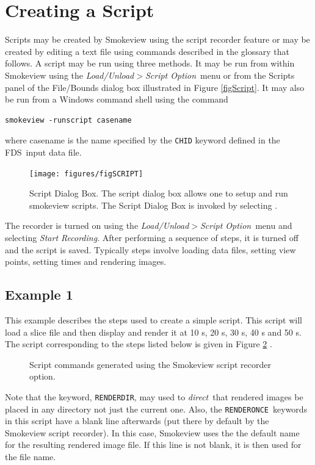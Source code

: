\documentclass[11pt,twoside]{book}
\newcommand{\fdsinput}[1]{
{
\scriptsize

}
}
\newcommand{\figoptions}{hbp}
\newcommand{\fds}{{FDS}}
\newcommand{\frameit}[1]{\fbox{\tt #1}}
\begin{document}
\section{Creating a Script}
Scripts may be created by Smokeview using the script recorder feature
or may be created by editing a text file using commands described in the glossary that follows.
A script may be run using three methods.  It may be run from within Smokeview using
the {\em Load/Unload$>$Script Option}\ menu or
from the Scripts panel of the File/Bounds dialog box illustrated in Figure \ref{figScript}.
It may also be run from a Windows command shell using the command

\begin{verbatim}
smokeview -runscript casename
\end{verbatim}

\noindent where casename is the name specified by
the {\tt CHID} keyword defined in the \fds\ input data file.

\begin{figure}[\figoptions]
\centerline{
\texttt{[image: figures/figSCRIPT]}
}
\caption[Script Dialog Box.]{Script Dialog Box. The script dialog box allows one
to setup and run smokeview scripts.  The
Script Dialog Box is invoked by selecting
\frameit{Dialogs$>$File/Bounds}. }
\label{figSCRIPT}
\end{figure}

The recorder is turned on using the
{\em Load/Unload$>$Script Option}\ menu and selecting {\em Start Recording}.
After performing a sequence of steps, it is turned off and the script is saved. Typically steps involve loading data files,
setting view points, setting times and rendering images.

\subsection{Example 1}

This example describes the steps used to create a simple script.  This script
will load a slice file and then display and render it at 10 s, 20 s, 30 s, 40 s and 50 s.
The script corresponding to the steps listed below is given
in Figure \ref{figsimplescripttext} .
\begin{figure}[\figoptions]
\fdsinput{script_slice_test.ssf}
\caption{Script commands generated using the Smokeview script recorder option.}
\label{figsimplescripttext}%
\end{figure}

Note that the keyword, {\tt RENDERDIR}, may used to {\em direct}\ that rendered images be placed in any directory not just the current one.  Also, the {\tt RENDERONCE}\ keywords in this script have a blank line afterwards (put there by default by the Smokeview script recorder).  In this case, Smokeview uses the the default name for the resulting rendered image file.  If this line is not blank, it is then used for the file name.
\end{document}
